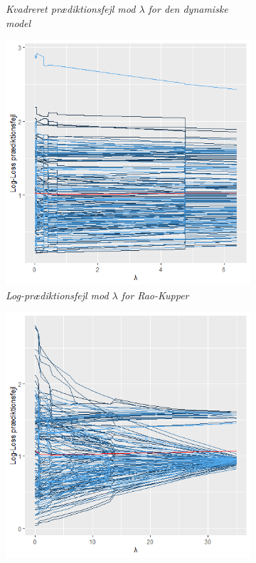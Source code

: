 \documentclass[11pt,a4paper]{article}
\begin{document}
\begin{figure}[h!]
\begin{subfigure}[b]{0.45\linewidth}
    \caption{\textit{Kvadreret prædiktionsfejl mod $\lambda$ for den dynamiske model}}
    \label{fig:DynMSPELine}
  \end{subfigure}
    \hspace{0.2cm}
    \begin{subfigure}[b]{0.45\textwidth}
    \includegraphics[width=\textwidth]{LOGLOSSSTATISK1.png}
    \caption{\textit{Log-prædiktionsfejl mod $\lambda$ for Rao-Kupper \textcolor{white}{modellen}}}
    \label{fig:LogLossStat}  
    \end{subfigure}
      \hspace{0.2cm}
  \begin{subfigure}[b]{0.45\linewidth}
\includegraphics[width=\textwidth]{LINELOGLOSSALPHA.png}

\end{subfigure}
\end{figure}
\end{document}
